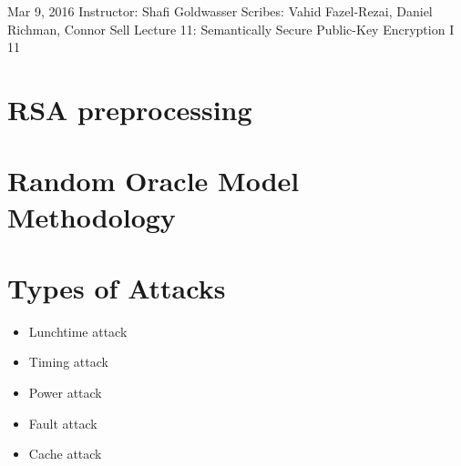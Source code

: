 \documentclass[10pt]{article}
\newcommand{\scribes}{Vahid Fazel-Rezai, Daniel Richman, Connor Sell}
\newcommand{\lecnumber}{11}
\newcommand{\lectitle}{Semantically Secure Public-Key Encryption I
}
\newcommand{\thedate}{Mar 9, 2016}
\begin{document}


{\thedate}
{Instructor: Shafi Goldwasser}
{Scribes: \scribes}
{Lecture \lecnumber: \lectitle}
{\lecnumber}


\section{RSA preprocessing}

\section{Random Oracle Model Methodology}

\section{Types of Attacks}

\begin{itemize}
	\item Lunchtime attack
	\item Timing attack
	\item Power attack
	\item Fault attack
	\item Cache attack
\end{itemize}
\end{document}
